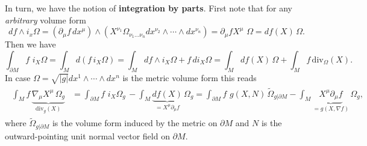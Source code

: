 \begin{mytheorem}
In turn, we have the notion of \textbf{integration by parts}.
First note that for any \emph{arbitrary} volume form
\begin{equation}
    df\wedge i_x \Omega = \left(\partial_\mu f \,dx^\mu\right)\wedge \left(X^{\nu_1} \Omega_{\nu_1 \dots \nu_n} dx^{\nu_2} \wedge \cdots \wedge dx^{\nu_n}\right) = \partial_\mu f X^{\mu}\,\, \Omega = df(X) \,\Omega.
\end{equation}
Then we have 
\begin{equation}
    \int_{\partial M} f\,\, i_X \Omega = \int_M d(f\, i_X \Omega) = \int_M df \wedge i_X \Omega + f\, d i_X\Omega = \int_M df(X) \,\Omega + \int_M f\, \mathrm{div}_\Omega (X).
\end{equation}
In case $\Omega = \sqrt{|g|} dx^1 \wedge \cdots \wedge dx^n$ is the metric volume form this reads
\begin{align}
\begin{aligned}
    \int_{M} f\, \underbrace{\nabla_\mu X^{\mu} \, \Omega_g}_{\mathrm{div}_g(X)}
    &= \int_{\partial M} f\,\, i_X\Omega_g\, - \int_M \underbrace{df(X)}_{= X^{\mu} \partial_\mu f} \, \Omega_g
    = \int_{\partial M} f\,\, g(X,N)\, \tilde{\Omega}_{g|\partial M} - \int_M \underbrace{X^{\mu} \partial_\mu f}_{=g(X,\nabla f)}\, \Omega_g,
\end{aligned}
\end{align}
where $\tilde{\Omega}_{g|\partial M}$ is the volume form induced by the metric on $\partial M$ and $N$ is the outward-pointing unit normal vector field on $\partial M$.
\end{mytheorem}
